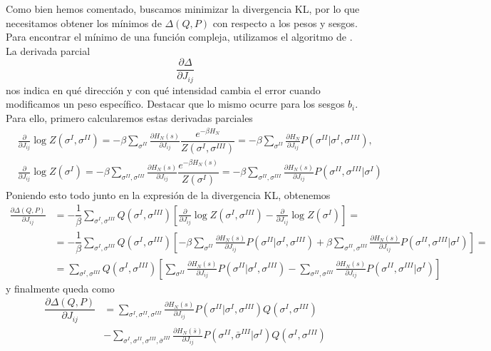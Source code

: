 \noindent
Como bien hemos comentado, buscamos minimizar la divergencia KL, por lo que necesitamos obtener los mínimos de $\Delta(Q, P)$ con respecto a los pesos y sesgos. Para encontrar el mínimo de una función compleja, utilizamos el algoritmo de . La derivada parcial 
\begin{equation*}
    \frac{\partial \Delta}{\partial J_{ij}}
\end{equation*}
nos indica en qué dirección y con qué intensidad cambia el error cuando modificamos un peso específico. Destacar que lo mismo ocurre para los sesgos $b_i$. Para ello, primero calcularemos estas derivadas parciales
\begin{align*}
    &\frac{\partial}{\partial J_{ij}}\log Z(\sigma^I, \sigma^{II}) = -\beta \sum_{\sigma^{II}} \frac{\partial H_N(s)}{\partial J_{ij}} \dfrac{e^{-\beta H_N}}{Z(\sigma^I, \sigma^{III})} = -\beta \sum_{\sigma^{II}} \frac{\partial H_N}{\partial J_{ij}} P(\sigma^{II} | \sigma^I, \sigma^{III}), \\
    &\frac{\partial}{\partial J_{ij}}\log Z(\sigma^I) = -\beta \sum_{\sigma^{II}, \sigma^{III}} \frac{\partial H_N(s)}{\partial J_{ij}} \dfrac{e^{-\beta H_N(s)}}{Z(\sigma^I)} = -\beta \sum_{\sigma^{II}, \sigma^{III}} \frac{\partial H_N(s)}{\partial J_{ij}} P(\sigma^{II}, \sigma^{III} | \sigma^I)
\end{align*}
Poniendo esto todo junto en la expresión de la divergencia KL, obtenemos
\begin{align*}
    \frac{\partial \Delta(Q, P)}{\partial J_{ij}} &= -\dfrac{1}{\beta}\sum_{\sigma^I, \sigma^{III}} Q(\sigma^I, \sigma^{III}) \left[ \frac{\partial}{\partial J_{ij}} \log Z(\sigma^I, \sigma^{III}) - \frac{\partial}{\partial J_{ij}} \log Z(\sigma^I) \right] =\\
    &= -\dfrac{1}{\beta}\sum_{\sigma^I, \sigma^{III}} Q(\sigma^I, \sigma^{III}) \left[ -\beta \sum_{\sigma^{II}} \frac{\partial H_N(s)}{\partial J_{ij}} P(\sigma^{II} | \sigma^I, \sigma^{III}) + \beta \sum_{\sigma^{II}, \sigma^{III}} \frac{\partial H_N(s)}{\partial J_{ij}} P(\sigma^{II}, \sigma^{III} | \sigma^I) \right] =\\
    &= \sum_{\sigma^I, \sigma^{III}} Q(\sigma^I, \sigma^{III}) \left[ \sum_{\sigma^{II}} \frac{\partial H_N(s)}{\partial J_{ij}} P(\sigma^{II} | \sigma^I, \sigma^{III}) - \sum_{\sigma^{II}, \sigma^{III}} \frac{\partial H_N(s)}{\partial J_{ij}} P(\sigma^{II}, \sigma^{III} | \sigma^I) \right]
\end{align*}
y finalmente queda como 
\begin{align*}
    \dfrac{\partial \Delta(Q, P)}{\partial J_{ij}} &=\sum_{\sigma^I,\sigma^{II},\sigma^{III}} \frac{\partial H_N(s)}{\partial J_{ij}} P(\sigma^{II} | \sigma^I, \sigma^{III}) Q(\sigma^I, \sigma^{III}) \\
    &- \sum_{\sigma^I, \sigma^{II}, \sigma^{III}, \bar{\sigma}^{III}} \frac{\partial H_N(\bar{s})}{\partial J_{ij}} P(\sigma^{II}, \bar{\sigma}^{III} | \sigma^I) Q(\sigma^I, \sigma^{III})
\end{align*}
